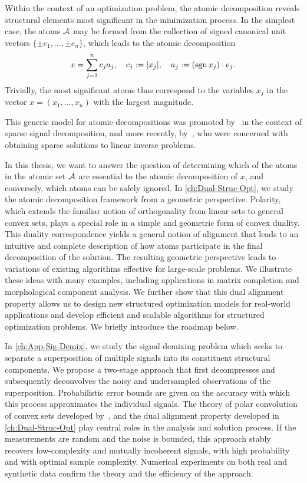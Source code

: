 Within the context of an optimization problem, the atomic decomposition reveals
structural elements most significant in the minimization process.
In the simplest case, the atoms $\mathcal{A}$ may be formed from the collection of
signed canonical unit vectors $\{\pm e_1,\ldots,\pm e_n\}$, which leads to the
atomic decomposition
\[
  x = \sum_{j=1}^n c_j a_j,
  \quad
  c_j: = |x_j|,
  \quad
  a_j:= (\operatorname{sgn} x_j)\cdot e_j.
\]
Trivially, the most significant atoms thus correspond to the variables $x_j$ in
the vector $x=(x_1,\ldots,x_n)$ with the largest magnitude.

This generic model for atomic decompositions was promoted by~\citet{cds98} in the context of sparse signal decomposition, and more recently, by~\citet{chandrasekaran2012convex}, who were concerned with obtaining sparse solutions to linear inverse problems. 

In this thesis, we want to answer the question of determining which of the atoms in the atomic set $\mathcal{A}$ are essential to the atomic decomposition of $x$, and conversely, which atoms can be safely ignored. In \autoref{ch:Dual-Struc-Opt}, we study the atomic decomposition framework from a geometric perspective. Polarity, which extends the familiar notion of orthogonality from linear sets to general convex sets, plays a special role in a simple and geometric form of convex duality. This duality correspondence yields a general notion of alignment that leads to an intuitive and complete description of how atoms participate in the final decomposition of the solution. The resulting geometric perspective leads to variations of existing algorithms effective for large-scale problems. We illustrate these ideas with many examples, including applications in matrix completion and morphological component analysis. We further show that this dual alignment property allows us to design new structured optimization models for real-world applications and develop efficient and scalable algorithms for structured optimization problems. We briefly introduce the roadmap below. 

In \autoref{ch:App-Sig-Demix}, we study the signal demixing problem which seeks to separate a superposition of multiple signals into its constituent structural components. We propose a two-stage approach that first decompresses and subsequently deconvolves the noisy and undersampled observations of the superposition. Probabilistic error bounds are given on the accuracy with which this process approximates the individual signals. The theory of polar convolution of convex sets developed by~\citet{friedlander2019polarconvolution}, and the dual alignment property developed in \autoref{ch:Dual-Struc-Opt} play central roles in the analysis and solution process. If the measurements are random and the noise is bounded, this approach stably recovers low-complexity and mutually incoherent signals, with high probability and with optimal sample complexity. Numerical experiments on both real and synthetic data confirm the theory and the efficiency of the approach.


